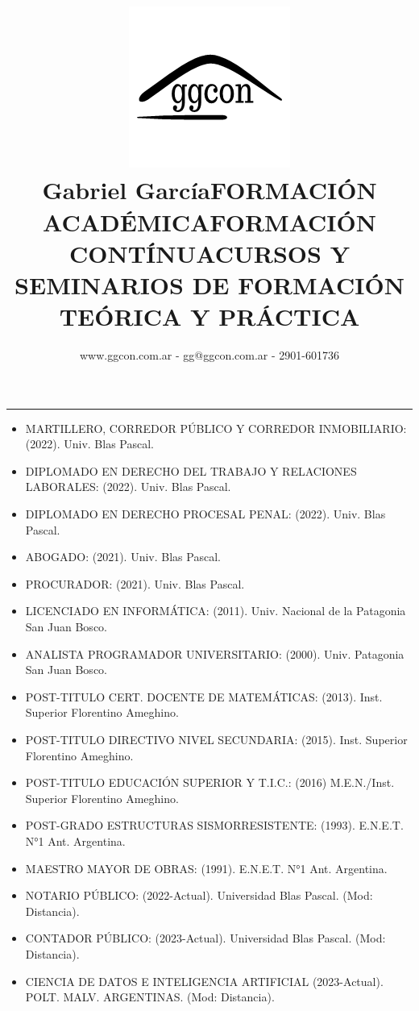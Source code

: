 \documentclass[a4paper,oneside,10pt]{article}
\title{ \includegraphics[scale=0.33]{img/logo ggcon.png} \\ \bf Gabriel García}
\author{www.ggcon.com.ar - gg@ggcon.com.ar - 2901-601736}
\date{}
\begin{document}
\maketitle  
\hrule

\begin{center}
    \title{FORMACIÓN ACADÉMICA}   
\end{center}

\begin{itemize}
    \item MARTILLERO, CORREDOR PÚBLICO Y CORREDOR INMOBILIARIO: (2022). Univ. Blas Pascal.
    \item DIPLOMADO EN DERECHO DEL TRABAJO Y RELACIONES LABORALES: (2022). Univ. Blas Pascal.
    \item DIPLOMADO EN DERECHO PROCESAL PENAL: (2022). Univ. Blas Pascal.
    \item ABOGADO: (2021). Univ. Blas Pascal.
    \item PROCURADOR: (2021). Univ. Blas Pascal.
    \item LICENCIADO EN INFORMÁTICA: (2011). Univ. Nacional de la Patagonia San Juan Bosco.
    \item ANALISTA PROGRAMADOR UNIVERSITARIO: (2000). Univ. Patagonia San Juan Bosco.
    \item POST-TITULO CERT. DOCENTE DE MATEMÁTICAS: (2013). Inst. Superior Florentino Ameghino.
    \item POST-TITULO DIRECTIVO NIVEL SECUNDARIA: (2015). Inst. Superior Florentino Ameghino.
    \item POST-TITULO EDUCACIÓN SUPERIOR Y T.I.C.: (2016) M.E.N./Inst. Superior Florentino Ameghino.
    \item POST-GRADO ESTRUCTURAS SISMORRESISTENTE: (1993). E.N.E.T. N°1 Ant. Argentina.
    \item MAESTRO MAYOR DE OBRAS: (1991). E.N.E.T. N°1 Ant. Argentina.
\end{itemize}
\begin{center}
    \title{FORMACIÓN CONTÍNUA}   
\end{center}

\begin{itemize}
    \item NOTARIO PÚBLICO: (2022-Actual). Universidad Blas Pascal. (Mod: Distancia).
    \item CONTADOR PÚBLICO: (2023-Actual). Universidad Blas Pascal. (Mod: Distancia).
    \item CIENCIA DE DATOS E INTELIGENCIA ARTIFICIAL (2023-Actual). POLT. MALV. ARGENTINAS. (Mod: Distancia).
\end{itemize}
\begin{center}
    \title{CURSOS Y SEMINARIOS DE FORMACIÓN TEÓRICA Y PRÁCTICA}   
\end{center}
\end{document}
